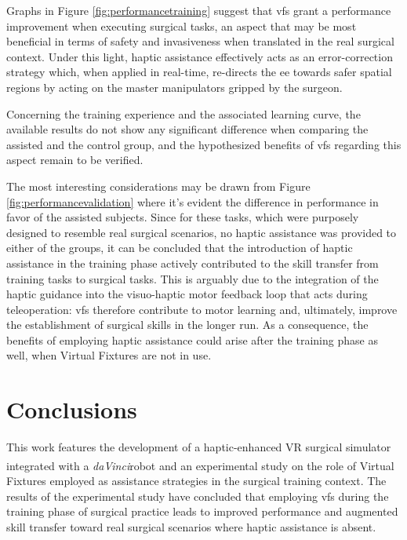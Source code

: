\documentclass{article}
\newcommand{\cright}{\textsuperscript{\textregistered}\phantom{..}}
\begin{document}
\begin{multicols}{2}
Graphs in Figure \ref{fig:performancetraining} suggest that \acp{vf} grant a performance improvement when executing surgical tasks, an aspect that may be most beneficial in terms of safety and invasiveness when translated in the real surgical context. Under this light, haptic assistance effectively acts as an error-correction strategy which, when applied in real-time, re-directs the \ac{ee} towards safer spatial regions by acting on the master manipulators gripped by the surgeon.

Concerning the training experience and the associated learning curve, the available results do not show any significant difference when comparing the assisted and the control group, and the hypothesized benefits of \acp{vf} regarding this aspect remain to be verified.

The most interesting considerations may be drawn from Figure \ref{fig:performancevalidation} where it's evident the difference in performance in favor of the assisted subjects. Since for these tasks, which were purposely designed to resemble real surgical scenarios, no haptic assistance was provided to either of the groups, it can be concluded that the introduction of haptic assistance in the training phase actively contributed to the skill transfer from training tasks to surgical tasks. This is arguably due to the integration of the haptic guidance into the visuo-haptic motor feedback loop that acts during teleoperation: \acp{vf} therefore contribute to motor learning and, ultimately, improve the establishment of surgical skills in the longer run. As a consequence, the benefits of employing haptic assistance could arise after the training phase as well, when Virtual Fixtures are not in use.
\section{Conclusions}
This work features the development of a haptic-enhanced VR surgical simulator integrated with a \textit{daVinci}\cright robot and an experimental study on the role of Virtual Fixtures employed as assistance strategies in the surgical training context. The results of the experimental study have concluded that employing \acp{vf} during the training phase of surgical practice leads to improved performance and augmented skill transfer toward real surgical scenarios where haptic assistance is absent.



\end{multicols}
\end{document}
